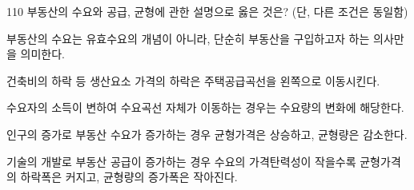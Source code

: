 \begin{question}{110}
부동산의 수요와 공급, 균형에 관한 설명으로 옳은 것은? (단, 다른 조건은 동일함)
\begin{choices}
  \item 부동산의 수요는 유효수요의 개념이 아니라, 단순히 부동산을 구입하고자 하는 의사만을 의미한다.
  \item 건축비의 하락 등 생산요소 가격의 하락은 주택공급곡선을 왼쪽으로 이동시킨다.
  \item 수요자의 소득이 변하여 수요곡선 자체가 이동하는 경우는 수요량의 변화에 해당한다.
  \item 인구의 증가로 부동산 수요가 증가하는 경우 균형가격은 상승하고, 균형량은 감소한다.
  \item 기술의 개발로 부동산 공급이 증가하는 경우 수요의 가격탄력성이 작을수록 균형가격의 하락폭은 커지고, 균형량의 증가폭은 작아진다.
\end{choices}
\end{question}

